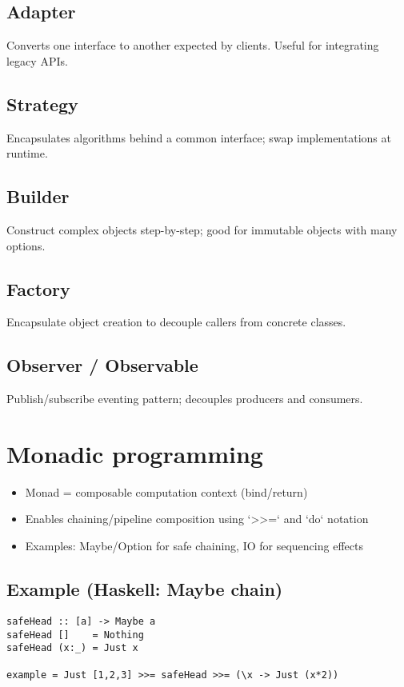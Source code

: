 \documentclass{article}
\begin{document}
\pagebreak

\subsection{Adapter}
Converts one interface to another expected by clients. Useful for integrating legacy APIs.

\pagebreak

\subsection{Strategy}
Encapsulates algorithms behind a common interface; swap implementations at runtime.

\pagebreak

\subsection{Builder}
Construct complex objects step-by-step; good for immutable objects with many options.

\pagebreak

\subsection{Factory}
Encapsulate object creation to decouple callers from concrete classes.

\pagebreak

\subsection{Observer / Observable}
Publish/subscribe eventing pattern; decouples producers and consumers.

\pagebreak

\section{Monadic programming}
\begin{itemize}
  \item Monad = composable computation context (bind/return)
  \item Enables chaining/pipeline composition using `>>=` and `do` notation
  \item Examples: Maybe/Option for safe chaining, IO for sequencing effects
\end{itemize}

\subsection*{Example (Haskell: Maybe chain)}
\begin{verbatim}
safeHead :: [a] -> Maybe a
safeHead []    = Nothing
safeHead (x:_) = Just x

example = Just [1,2,3] >>= safeHead >>= (\x -> Just (x*2))
\end{verbatim}
\end{document}
